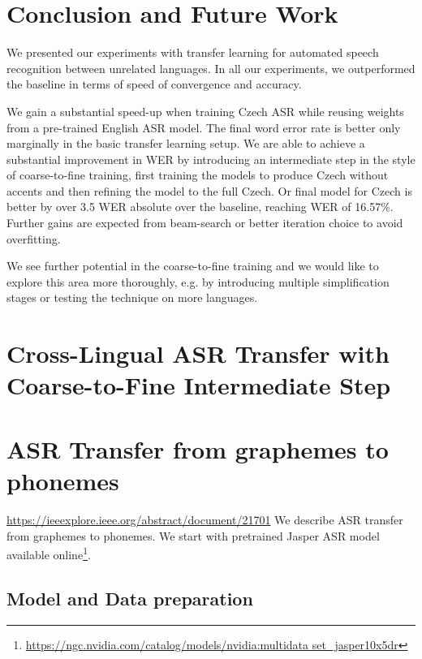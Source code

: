 \section{Conclusion and Future Work}
\label{sec:conclusion}

We presented our experiments with transfer learning for automated speech recognition between unrelated languages.
In all our experiments, we outperformed the baseline in terms of speed of convergence and accuracy.

We gain a substantial speed-up when training Czech ASR while reusing weights from a pre-trained English ASR model. The final word error rate is better only marginally in the basic transfer learning setup.
%
We are able to achieve a substantial improvement in WER by introducing an intermediate step in the style of coarse-to-fine training, first training the models to produce Czech without accents and then refining the model to the full Czech.
Or final model for Czech is better by over 3.5 WER absolute over the baseline, reaching WER of 16.57\%. Further gains are expected from beam-search or better iteration choice to avoid overfitting.


We see further potential in the coarse-to-fine training and we would like to explore this area more thoroughly, e.g. by introducing multiple simplification stages or testing the technique on more languages.

\section{Cross-Lingual ASR Transfer with Coarse-to-Fine Intermediate Step}


\section{ASR Transfer from graphemes to phonemes}
\url{https://ieeexplore.ieee.org/abstract/document/21701}
We describe ASR transfer from graphemes to phonemes. We start with pretrained Jasper ASR model available online\footnote{\url{https://ngc.nvidia.com/catalog/models/nvidia:multidata set_jasper10x5dr}}.

\subsection{Model and Data preparation}





